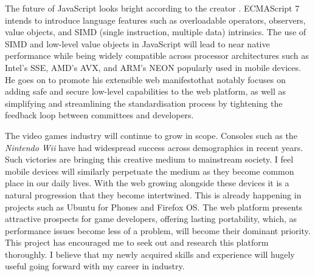 \documentclass[final]{cmpreport}
\begin{document}
The future of JavaScript looks bright according to the creator \citet{Eich}. ECMAScript 7 intends to introduce language features such as overloadable operators, observers, value objects, and SIMD (single instruction, multiple data) intrinsics. The use of SIMD and low-level value objects in JavaScript will lead to near native performance while being widely compatible across processor architectures such as Intel's SSE, AMD's AVX, and ARM's NEON popularly used in mobile devices. He goes on to promote his extensible web manifesto\footnotemark[29] that notably focuses on adding safe and secure low-level capabilities to the web platform, as well as simplifying and streamlining the standardisation process by tightening the feedback loop between committees and developers.


The video games industry will continue to grow in scope. Consoles such as the \textit{Nintendo Wii} have had widespread success across demographics in recent years. Such victories are bringing this creative medium to mainstream society. I feel mobile devices will similarly perpetuate the medium as they become common place in our daily lives. With the web growing alongside these devices it is a natural progression that they become intertwined. This is already happening in projects such as Ubuntu for Phones and Firefox OS. The web platform presents attractive prospects for game developers, offering lasting portability, which, as performance issues become less of a problem, will become their dominant priority. This project has encouraged me to seek out and research this platform thoroughly. I believe that my newly acquired skills and experience will hugely useful going forward with my career in industry.

\clearpage

\end{document}
